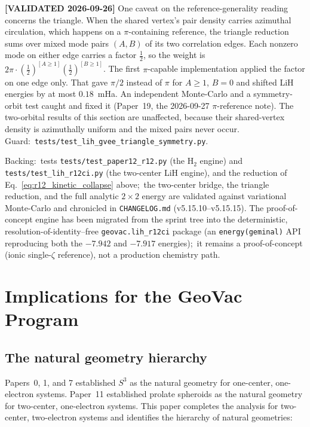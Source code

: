 \documentclass[aps,pra,twocolumn,superscriptaddress,longbibliography]{revtex4-2}
\begin{document}
\textbf{[VALIDATED 2026-09-26]}  One caveat on the reference-generality reading
concerns the triangle.  When the shared vertex's pair density carries azimuthal
circulation, which happens on a $\pi$-containing reference, the triangle reduction
sums over mixed mode pairs $(A,B)$ of its two correlation edges.  Each nonzero
mode on either edge carries a factor $\tfrac12$, so the weight is
$2\pi\cdot(\tfrac12)^{[A\ge1]}(\tfrac12)^{[B\ge1]}$.  The first $\pi$-capable
implementation applied the factor on one edge only.  That gave $\pi/2$ instead of
$\pi$ for $A\ge1$, $B=0$ and shifted LiH energies by at most $0.18$~mHa.  An
independent Monte-Carlo and a symmetry-orbit test caught and fixed it
(Paper~19, the 2026-09-27 $\pi$-reference note).  The two-orbital results of this
section are unaffected, because their shared-vertex density is azimuthally
uniform and the mixed pairs never occur.  Guard:\
\texttt{tests/test\_lih\_gvee\_triangle\_symmetry.py}.

Backing:\ tests \texttt{tests/test\_paper12\_r12.py} (the H$_2$ engine) and
\texttt{tests/test\_lih\_r12ci.py} (the two-center LiH engine), and the reduction
of Eq.~\eqref{eq:r12_kinetic_collapse} above;\ the two-center bridge, the triangle
reduction, and the full analytic $2\times2$ energy are validated against
variational Monte-Carlo and chronicled in \texttt{CHANGELOG.md}
(v5.15.10--v5.15.15).  The proof-of-concept engine has been migrated from the
sprint tree into the deterministic, resolution-of-identity--free
\texttt{geovac.lih\_r12ci} package (an \texttt{energy(geminal)} API reproducing
both the $-7.942$ and $-7.917$ energies);\ it remains a proof-of-concept (ionic
single-$\zeta$ reference), not a production chemistry path.


\section{Implications for the GeoVac Program}
\label{sec:implications}

\subsection{The natural geometry hierarchy}

Papers~0, 1, and 7 established $S^3$ as the natural geometry
for one-center, one-electron systems.  Paper~11 established
prolate spheroids as the natural geometry for two-center,
one-electron systems.  This paper completes the analysis for
two-center, two-electron systems and identifies the hierarchy
of natural geometries:
\end{document}
